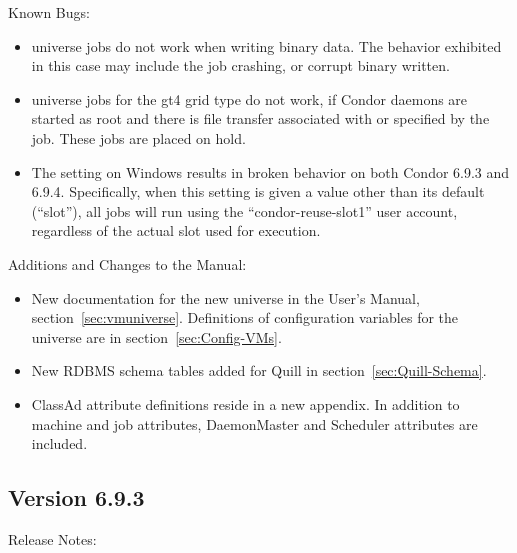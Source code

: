 \noindent Known Bugs:

\begin{itemize}

\item {} universe jobs do not work
  when writing binary data.  The behavior exhibited in this
  case may include the job crashing, or corrupt binary written.

\item {} universe jobs for the gt4 grid type do not work, 
if Condor daemons are started as root
and there is file transfer associated with or specified by the job.
These jobs are placed on hold.

\item The  setting on Windows results
in broken behavior on both Condor 6.9.3 and 6.9.4. Specifically, when
this setting is given a value other than its default (``slot''), all
jobs will run using the ``condor-reuse-slot1'' user account,
regardless of the actual slot used for execution.

\end{itemize}

\noindent Additions and Changes to the Manual:

\begin{itemize}

\item New documentation for the new  universe
in the User's Manual, section~\ref{sec:vmuniverse}.
Definitions of configuration variables for the  universe are in
section~\ref{sec:Config-VMs}.

\item New RDBMS schema tables added for Quill in
section~\ref{sec:Quill-Schema}.

\item ClassAd attribute definitions reside in a new appendix.
In addition to machine and job attributes, DaemonMaster and Scheduler
attributes are included.
\end{itemize}

\subsection*{\label{sec:New-6-9-3}Version 6.9.3}

\noindent Release Notes:

